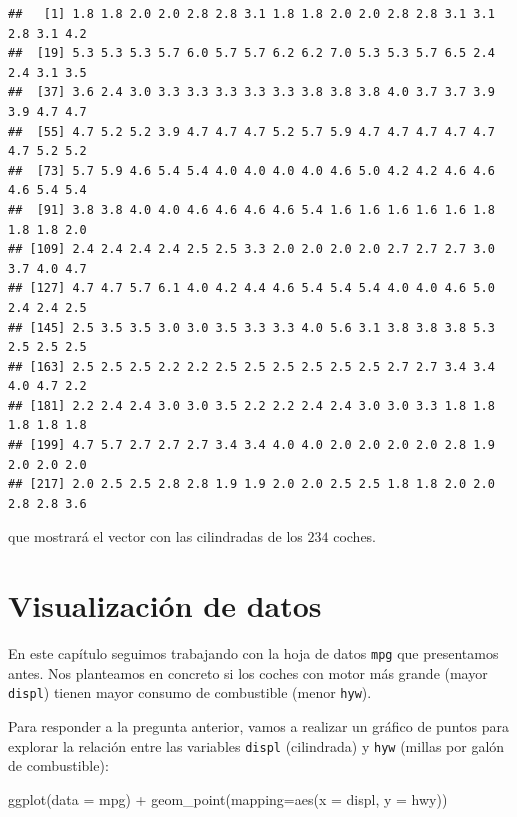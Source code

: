 \documentclass[
  degree=mecinf,
  title=normal,
  toc=normal,
  bib=normal]{mnye}
\newenvironment{Shaded}{\begin{snugshade}}{\end{snugshade}}
\newcommand{\AttributeTok}[1]{\textcolor[rgb]{0.77,0.63,0.00}{#1}}
\newcommand{\FunctionTok}[1]{\textcolor[rgb]{0.00,0.00,0.00}{#1}}
\newcommand{\NormalTok}[1]{#1}
\newcommand{\SpecialCharTok}[1]{\textcolor[rgb]{0.00,0.00,0.00}{#1}}
\begin{document}
\begin{Shaded}
\end{Shaded}

\begin{verbatim}
##   [1] 1.8 1.8 2.0 2.0 2.8 2.8 3.1 1.8 1.8 2.0 2.0 2.8 2.8 3.1 3.1 2.8 3.1 4.2
##  [19] 5.3 5.3 5.3 5.7 6.0 5.7 5.7 6.2 6.2 7.0 5.3 5.3 5.7 6.5 2.4 2.4 3.1 3.5
##  [37] 3.6 2.4 3.0 3.3 3.3 3.3 3.3 3.3 3.8 3.8 3.8 4.0 3.7 3.7 3.9 3.9 4.7 4.7
##  [55] 4.7 5.2 5.2 3.9 4.7 4.7 4.7 5.2 5.7 5.9 4.7 4.7 4.7 4.7 4.7 4.7 5.2 5.2
##  [73] 5.7 5.9 4.6 5.4 5.4 4.0 4.0 4.0 4.0 4.6 5.0 4.2 4.2 4.6 4.6 4.6 5.4 5.4
##  [91] 3.8 3.8 4.0 4.0 4.6 4.6 4.6 4.6 5.4 1.6 1.6 1.6 1.6 1.6 1.8 1.8 1.8 2.0
## [109] 2.4 2.4 2.4 2.4 2.5 2.5 3.3 2.0 2.0 2.0 2.0 2.7 2.7 2.7 3.0 3.7 4.0 4.7
## [127] 4.7 4.7 5.7 6.1 4.0 4.2 4.4 4.6 5.4 5.4 5.4 4.0 4.0 4.6 5.0 2.4 2.4 2.5
## [145] 2.5 3.5 3.5 3.0 3.0 3.5 3.3 3.3 4.0 5.6 3.1 3.8 3.8 3.8 5.3 2.5 2.5 2.5
## [163] 2.5 2.5 2.5 2.2 2.2 2.5 2.5 2.5 2.5 2.5 2.5 2.7 2.7 3.4 3.4 4.0 4.7 2.2
## [181] 2.2 2.4 2.4 3.0 3.0 3.5 2.2 2.2 2.4 2.4 3.0 3.0 3.3 1.8 1.8 1.8 1.8 1.8
## [199] 4.7 5.7 2.7 2.7 2.7 3.4 3.4 4.0 4.0 2.0 2.0 2.0 2.0 2.8 1.9 2.0 2.0 2.0
## [217] 2.0 2.5 2.5 2.8 2.8 1.9 1.9 2.0 2.0 2.5 2.5 1.8 1.8 2.0 2.0 2.8 2.8 3.6
\end{verbatim}

que mostrará el vector con las cilindradas de los \(234\) coches.

\hypertarget{plots}{%
\section{Visualización de datos}\label{plots}}

En este capítulo seguimos trabajando con la hoja de datos \texttt{mpg} que presentamos antes.
Nos planteamos en concreto si los coches con motor más grande (mayor \texttt{displ}) tienen mayor consumo de combustible (menor \texttt{hyw}).

Para responder a la pregunta anterior, vamos a realizar un gráfico de puntos para explorar la relación entre las variables \texttt{displ} (cilindrada) y \texttt{hyw} (millas por galón de combustible):

\begin{Shaded}
\begin{Highlighting}[]
\FunctionTok{ggplot}\NormalTok{(}\AttributeTok{data =}\NormalTok{ mpg) }\SpecialCharTok{+} 
    \FunctionTok{geom\_point}\NormalTok{(}\AttributeTok{mapping=}\FunctionTok{aes}\NormalTok{(}\AttributeTok{x =}\NormalTok{ displ, }\AttributeTok{y =}\NormalTok{ hwy)) }
\end{Highlighting}
\end{Shaded}
\end{document}
